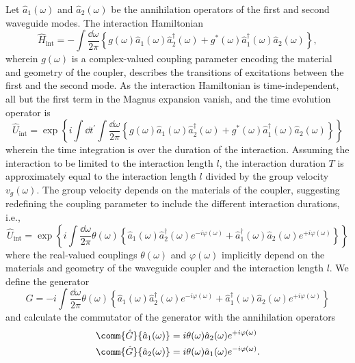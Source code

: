 Let $\hat{a}_1(\omega)$ and $\hat{a}_2(\omega)$ be the annihilation operators of the first and second waveguide modes.
The interaction Hamiltonian
\begin{equation}
	\hat{H}_\text{int}
	=
	-
	\int\frac{\dd{\omega}}{2\pi}
	\left\{
		g(\omega)
		\hat{a}_1(\omega)
		\hat{a}_2^\dagger(\omega)
		+
		g^*(\omega)
		\hat{a}_1^\dagger(\omega)
		\hat{a}_2(\omega)
	\right\}
	,
\end{equation}
wherein $g(\omega)$ is a complex-valued coupling parameter encoding the material and geometry of the coupler, describes the transitions of excitations between the first and the second mode.
As the interaction Hamiltonian is time-independent, all but the first term in the Magnus expansion vanish, and the time evolution operator is
\begin{equation}
	\hat{U}_\text{int}
	=
	\exp\left\{
		i
		\int\dd{t^\prime}
		\int\frac{\dd{\omega}}{2\pi}
		\left\{
			g(\omega)
			\hat{a}_1(\omega)
			\hat{a}_2^\dagger(\omega)
			+
			g^*(\omega)
			\hat{a}_1^\dagger(\omega)
			\hat{a}_2(\omega)
		\right\}
	\right\}
\end{equation}
wherein the time integration is over the duration of the interaction.
Assuming the interaction to be limited to the interaction length $l$, the interaction duration $T$ is approximately equal to the interaction length $l$ divided by the group velocity $v_g(\omega)$.
The group velocity depends on the materials of the coupler, suggesting redefining the coupling parameter to include the different interaction durations, i.e.,
\begin{equation}
	\hat{U}_\text{int}
	=
	\exp\left\{
		i
		\int\frac{\dd{\omega}}{2\pi}
		\theta(\omega)
		\left\{
			\hat{a}_1(\omega)
			\hat{a}_2^\dagger(\omega)
			e^{-i\varphi(\omega)}
			+
			\hat{a}_1^\dagger(\omega)
			\hat{a}_2(\omega)
			e^{+i\varphi(\omega)}
		\right\}
	\right\}
\end{equation}
where the real-valued couplings $\theta(\omega)$ and $\varphi(\omega)$ implicitly depend on the materials and geometry of the waveguide coupler and the interaction length $l$.
We define the generator
\begin{equation}
	\hat{G}
	=
	-i
	\int\frac{\dd{\omega}}{2\pi}
	\theta(\omega)
	\left\{
		\hat{a}_1(\omega)
		\hat{a}_2^\dagger(\omega)
		e^{-i\varphi(\omega)}
		+
		\hat{a}_1^\dagger(\omega)
		\hat{a}_2(\omega)
		e^{+i\varphi(\omega)}
	\right\}
\end{equation}
and calculate the commutator of the generator with the annihilation operators
\begin{align}
	\comm{\hat{G}}{\hat{a}_1(\omega)}
	&=
	i
	\theta(\omega)
	\hat{a}_2(\omega)
	e^{+i\varphi(\omega)}
	\\
	\comm{\hat{G}}{\hat{a}_2(\omega)}
	&=
	i
	\theta(\omega)
	\hat{a}_1(\omega)
	e^{-i\varphi(\omega)}
	.
\end{align}
